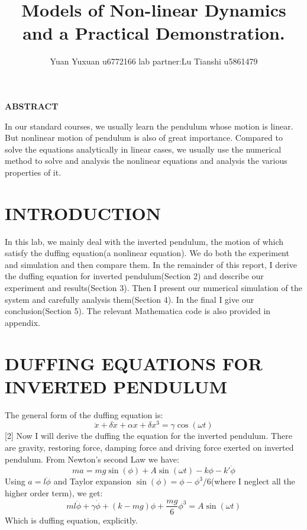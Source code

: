\documentclass{article}
\title{Models of Non-linear Dynamics and a Practical Demonstration.}
\author{{Yuan Yuxuan  u6772166 lab partner:Lu Tianshi u5861479}}
\date{}
\begin{document}
\maketitle
\textbf{ABSTRACT}

In our standard courses, we usually learn the pendulum whose motion is linear. But nonlinear motion of pendulum is also of great importance. Compared to solve the equations analytically in linear cases, we usually use the numerical method to solve and analysis the nonlinear equations and analysis the various properties of it.

\section{\textbf{INTRODUCTION}}

In this lab, we mainly deal with the inverted pendulum, the motion of which satisfy the duffing equation(a nonlinear equation). We do both the experiment and simulation and then compare them. In the remainder of this report, I derive the duffing equation for inverted pendulum(Section 2) and describe our experiment and results(Section 3). Then I present our numerical simulation of the system and carefully analysis them(Section 4). In the final I give our conclusion(Section 5). The relevant Mathematica code is also provided in appendix.


\section{\textbf{DUFFING EQUATIONS FOR INVERTED PENDULUM}}

The general form of the duffing equation is:
\begin{equation}
\ddot{x}+\delta\dot{x}+\alpha x+\delta x^3 = \gamma\cos(\omega t)
\end{equation}[2]
Now I will derive the duffing the equation for the inverted pendulum. There are gravity, restoring force, damping force and driving force exerted on inverted pendulum. From Newton's second Law we have:
\begin{equation}
ma = mg\sin(\phi) + A\sin(\omega t)-k\phi-k'\dot{\phi}
\end{equation}
Using $a = l\ddot\phi$ and Taylor expansion $\sin(\phi) = \phi - \phi^3/6$(where I neglect all the higher order term), we get:
\begin{equation}
ml\ddot{\phi} + \gamma\dot{\phi} + (k-mg)\phi +\frac{mg}{6}\phi^3=  A\sin(\omega t)
\end{equation}
Which is duffing equation, explicitly.
\end{document}
